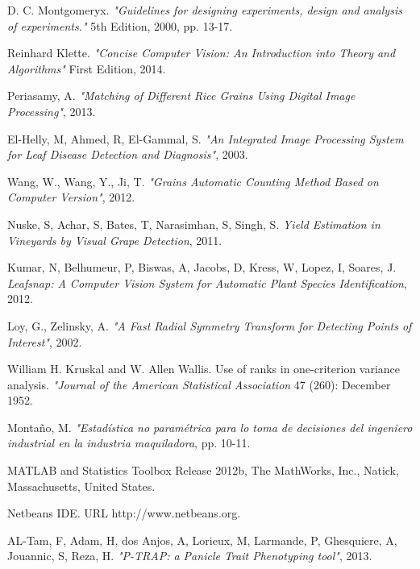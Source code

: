 \begin{thebibliography}{9}
D. C. Montgomeryx.
\textit{"Guidelines for designing experiments, design and analysis of experiments."} 5th Edition, 2000, pp. 13-17.

Reinhard Klette.
\textit{"Concise Computer Vision: An Introduction into Theory and Algorithms"} First Edition, 2014.

Periasamy, A. 
\textit{"Matching of Different Rice Grains Using Digital Image Processing"}, 2013.

El-Helly, M, Ahmed, R, El-Gammal, S. 
\textit{"An Integrated Image Processing System for Leaf Disease Detection and Diagnosis"}, 2003.

Wang, W., Wang, Y., Ji, T. 
\textit{"Grains Automatic Counting Method Based on Computer Version"}, 2012.

Nuske, S, Achar, S, Bates, T, Narasimhan, S, Singh, S.
\textit{Yield Estimation in Vineyards by Visual Grape Detection}, 2011.

Kumar, N, Belhumeur, P, Biswas, A, Jacobs, D, Kress, W, Lopez, I, Soares, J.
\textit{Leafsnap: A Computer Vision System for Automatic Plant Species Identification}, 2012.

Loy, G., Zelinsky, A. 
\textit{"A Fast Radial Symmetry Transform for Detecting Points of Interest"}, 2002.

William H. Kruskal and W. Allen Wallis. 
Use of ranks in one-criterion variance analysis. \textit{"Journal of the American Statistical Association} 47 (260): December 1952.

Monta\~no, M. 
\textit{"Estad\'istica no param\'etrica para lo toma de decisiones del ingeniero industrial en la industria maquiladora}, pp. 10-11.

MATLAB and Statistics Toolbox Release 2012b, The MathWorks, Inc., Natick, Massachusetts, United States.

Netbeans IDE. URL http://www.netbeans.org.

AL-Tam, F, Adam, H, dos Anjos, A, Lorieux, M, Larmande, P, Ghesquiere, A, Jouannic, S, Reza, H. \textit{"P-TRAP: a Panicle Trait Phenotyping tool"}, 2013.
\end{thebibliography}